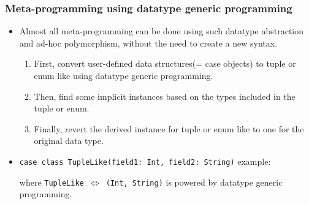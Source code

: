 \begin{frame}[fragile]
  \frametitle{Meta-programming using datatype generic programming}
  
  \begin{itemize}
    \item Almost all meta-programming can be done using such datatype abstraction
    and ad-hoc polymorphism, without the need to create a new syntax.
    \pause
    \begin{enumerate}
      \item First, convert user-defined data structures(= case objects) to tuple or enum like using datatype generic programming.
      \item Then, find some implicit instances based on the types included in the tuple or enum.
      \item Finally, revert the derived instance for tuple or enum like to one for the original data type.
    \end{enumerate}

    \pause
    \item \lstinline|case class TupleLike(field1: Int, field2: String)| example:
    \begin{scaledprooftree}{0.8}
    \end{scaledprooftree}
    where {\small \texttt{TupleLike $\Leftrightarrow$ (Int, String)}} is powered by datatype generic programming.
  \end{itemize}

\end{frame}


